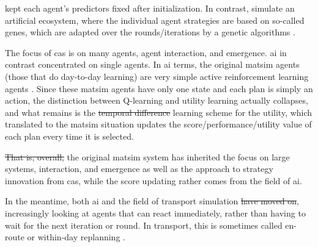 \citet{ArthurBar} kept each agent's predictors fixed after initialization.  In contrast,
\citet{HraberJonesForrestEcho} simulate an artificial ecosystem, where the individual agent strategies are based on so-called genes, which are adapted over the rounds/iterations by a genetic algorithms \citep{Goldberg_1989}.

The focus of \gls{cas} is on many agents, agent interaction, and emergence. \Gls{ai} in contrast concentrated on single agents. In \gls{ai} terms, the original \gls{matsim} agents (those that do day-to-day learning) are very simple active reinforcement learning agents \citep[][Chapter 21.3]{RusselNorvig2010ArtificialIntelligence}. Since these \gls{matsim} agents have only one state and each plan is simply an action, the distinction between Q-learning and utility learning actually collapses, and what remains is the \st{temporal difference}   learning scheme for the utility, which translated to the \gls{matsim} situation updates the score/performance/utility value of each plan every time it is selected.

\st{That is, overall,} the original \gls{matsim} system has inherited the focus on large systems, interaction, and emergence as well as the approach to strategy innovation from \gls{cas}, while the score updating rather comes from the field of \gls{ai}.

In the meantime, both \gls{ai} and the field of transport simulation \st{have moved on},  increasingly looking at agents that can react immediately, rather than having to wait for the next iteration or round.  In transport, this is sometimes called en-route or within-day replanning \citep[e.g.,][]{EmmerinkEtAl_TransResC_1995,balijepalli-2007}.

